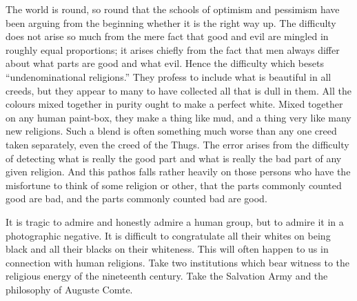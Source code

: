 
The world is round, so round that the schools of optimism and pessimism have been arguing from the beginning whether it is the right way up. The difficulty does not arise so much from the mere fact that good and evil are mingled in roughly equal proportions; it arises chiefly from the fact that men always differ about what parts are good and what evil. Hence the difficulty which besets “undenominational religions.” They profess to include what is beautiful in all creeds, but they appear to many to have collected all that is dull in them. All the colours mixed together in purity ought to make a perfect white. Mixed together on any human paint-box, they make a thing like mud, and a thing very like many new religions. Such a blend is often something much worse than any one creed taken separately, even the creed of the Thugs. The error arises from the difficulty of detecting what is really the good part and what is really the bad part of any given religion. And this pathos falls rather heavily on those persons who have the misfortune to think of some religion or other, that the parts commonly counted good are bad, and the parts commonly counted bad are good.

It is tragic to admire and honestly admire a human group, but to admire it in a photographic negative. It is difficult to congratulate all their whites on being black and all their blacks on their whiteness. This will often happen to us in connection with human religions. Take two institutions which bear witness to the religious energy of the nineteenth century. Take the Salvation Army and the philosophy of Auguste Comte.

